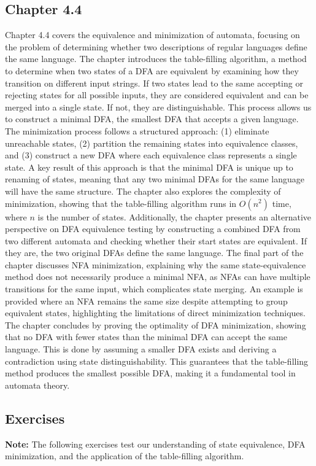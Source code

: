 \documentclass{article}
\begin{document}
\subsection{Chapter 4.4}
Chapter 4.4 covers the equivalence and minimization of automata, focusing on the problem of determining whether two descriptions of regular languages define the same language. The chapter introduces the table-filling algorithm, a method to determine when two states of a DFA are equivalent by examining how they transition on different input strings. If two states lead to the same accepting or rejecting states for all possible inputs, they are considered equivalent and can be merged into a single state. If not, they are distinguishable. This process allows us to construct a minimal DFA, the smallest DFA that accepts a given language. The minimization process follows a structured approach: (1) eliminate unreachable states, (2) partition the remaining states into equivalence classes, and (3) construct a new DFA where each equivalence class represents a single state. A key result of this approach is that the minimal DFA is unique up to renaming of states, meaning that any two minimal DFAs for the same language will have the same structure. The chapter also explores the complexity of minimization, showing that the table-filling algorithm runs in \(O(n^2)\) time, where \(n\) is the number of states. Additionally, the chapter presents an alternative perspective on DFA equivalence testing by constructing a combined DFA from two different automata and checking whether their start states are equivalent. If they are, the two original DFAs define the same language. The final part of the chapter discusses NFA minimization, explaining why the same state-equivalence method does not necessarily produce a minimal NFA, as NFAs can have multiple transitions for the same input, which complicates state merging. An example is provided where an NFA remains the same size despite attempting to group equivalent states, highlighting the limitations of direct minimization techniques. The chapter concludes by proving the optimality of DFA minimization, showing that no DFA with fewer states than the minimal DFA can accept the same language. This is done by assuming a smaller DFA exists and deriving a contradiction using state distinguishability. This guarantees that the table-filling method produces the smallest possible DFA, making it a fundamental tool in automata theory.

\subsection{Exercises}\label{sec:exercises}
\textbf{Note:} The following exercises test our understanding of state equivalence, DFA minimization, and the application of the table-filling algorithm.
\end{document}
